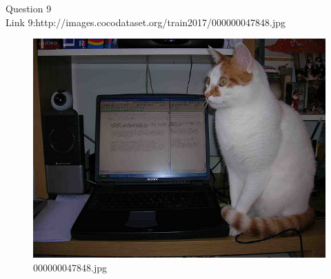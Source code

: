 Question 9\\
Link 9:http://images.cocodataset.org/train2017/000000047848.jpg
    \begin{figure}[h]
        \centering
        \includegraphics[width=0.8\linewidth]{../image set/easy/000000047848.jpg}
        \caption{000000047848.jpg}
    \end{figure}
